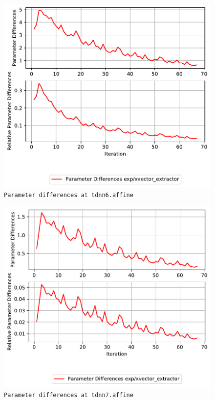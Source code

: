 \documentclass[prl,10pt,twocolumn]{revtex4}
\begin{document}
\newpage
\begin{figure}[h]
  \begin{center}
    \caption{\texttt{Parameter differences at tdnn6.affine}}
    \includegraphics[width=\textwidth]{exp/xvector_extractor/report/param_diff_tdnn6_dot_affine.pdf}
  \end{center}
\end{figure}
\clearpage


\newpage
\begin{figure}[h]
  \begin{center}
    \caption{\texttt{Parameter differences at tdnn7.affine}}
    \includegraphics[width=\textwidth]{exp/xvector_extractor/report/param_diff_tdnn7_dot_affine.pdf}
  \end{center}
\end{figure}
\clearpage
\end{document}
